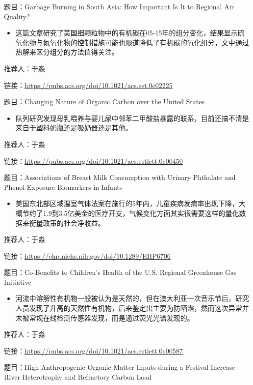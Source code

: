 \documentclass[
]{book}
\providecommand{\tightlist}{%
  \setlength{\itemsep}{0pt}\setlength{\parskip}{0pt}}
\begin{document}
题目：Garbage Burning in South Asia: How Important Is It to Regional Air Quality?

\begin{itemize}
\tightlist
\item
  这篇文章研究了美国细颗粒物中的有机碳在05-15年的组分变化，结果显示硫氧化物与氮氧化物的控制措施可能也顺道降低了有机碳的氧化组分，文中通过热解来区分组分的方法值得关注。
\end{itemize}

推荐人：于淼

链接：\url{https://pubs.acs.org/doi/10.1021/acs.est.0c02225}

题目：Changing Nature of Organic Carbon over the United States

\begin{itemize}
\tightlist
\item
  队列研究发现母乳喂养与婴儿尿中邻苯二甲酸盐暴露的联系，目前还搞不清是来自于塑料奶瓶还是吸奶器还是其他。
\end{itemize}

推荐人：于淼

链接：\url{https://pubs.acs.org/doi/10.1021/acs.estlett.0c00450}

题目：Associations of Breast Milk Consumption with Urinary Phthalate and Phenol Exposure Biomarkers in Infants

\begin{itemize}
\tightlist
\item
  美国东北部区域温室气体法案在施行的5年内，儿童疾病发病率出现下降，大概节约了1.9到3.5亿美金的医疗开支，气候变化方面其实很需要这样的量化数据来衡量政策的社会净收益。
\end{itemize}

推荐人：于淼

链接：\url{https://ehp.niehs.nih.gov/doi/10.1289/EHP6706}

题目：Co-Benefits to Children's Health of the U.S. Regional Greenhouse Gas Initiative

\begin{itemize}
\tightlist
\item
  河流中溶解性有机物一般被认为是天然的，但在澳大利亚一次音乐节后，研究人员发现了升高的天然性有机物，后来鉴定出主要为防晒霜，然而这次异常并未被常规在线检测传感器发现，而是通过荧光光谱发现的。
\end{itemize}

推荐人：于淼

链接：\url{https://pubs.acs.org/doi/10.1021/acs.estlett.0c00587}

题目：High Anthropogenic Organic Matter Inputs during a Festival Increase River Heterotrophy and Refractory Carbon Load
\end{document}
